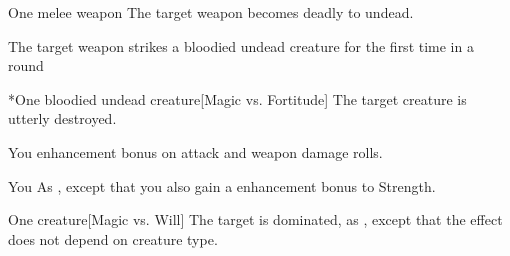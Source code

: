 \spellrng{\rngclose}
\spelldur{\durshort}
\begin{spelltarget}{One melee weapon}
    \spelleffect The target weapon becomes deadly to undead.
    \begin{spelltrigger}{The target weapon strikes a bloodied undead creature for the first time in a round}
        \begin{spelltarget}*{One bloodied undead creature}[Magic vs. Fortitude]
            \spellsuccess The target creature is utterly destroyed.
        \end{spelltarget}
    \end{spelltrigger}
\end{spelltarget}

\spelldur{\durshort}
\begin{spelltarget}{You}
    \spelleffect {} enhancement bonus on attack and weapon damage rolls. \spellbonusscalingdescription
\end{spelltarget}

\spelldur{\durshort}
\begin{spelltarget}{You}
    \spelleffect As , except that you also gain a  enhancement bonus to Strength.
\end{spelltarget}

\spellrng{\rngmed}
\begin{spelltarget}{One creature}[Magic vs. Will]
    \spellsuccess The target is dominated, as , except that the effect does not depend on creature type.
\end{spelltarget}

